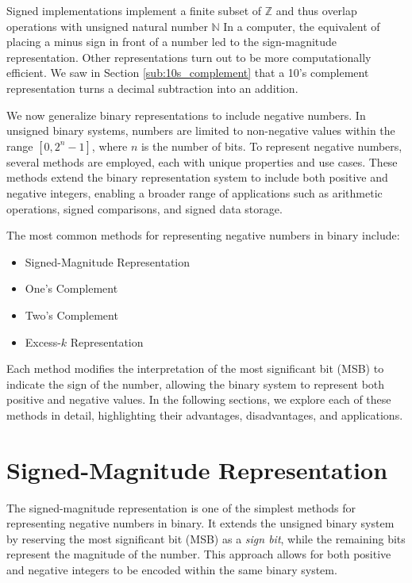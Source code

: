 Signed implementations implement a finite subset of $\mathbb{Z}$ and thus overlap operations with unsigned natural number $\mathbb{N}$ In a computer, the equivalent of placing a minus sign in front of a number led to the sign-magnitude representation. Other representations turn out to be more computationally efficient.  We saw in Section \ref{sub:10s_complement} that a 10's complement representation turns a decimal subtraction into an addition. 

We now generalize binary representations to include negative numbers. In unsigned binary systems, numbers are limited to non-negative values within the range \( [0, 2^n - 1] \), where \( n \) is the number of bits. To represent negative numbers, several methods are employed, each with unique properties and use cases. These methods extend the binary representation system to include both positive and negative integers, enabling a broader range of applications such as arithmetic operations, signed comparisons, and signed data storage.

The most common methods for representing negative numbers in binary include:
\begin{itemize}
    \item Signed-Magnitude Representation
    \item One's Complement
    \item Two's Complement
    \item Excess-\( k \) Representation
\end{itemize}

Each method modifies the interpretation of the most significant bit (MSB) to indicate the sign of the number, allowing the binary system to represent both positive and negative values. In the following sections, we explore each of these methods in detail, highlighting their advantages, disadvantages, and applications.

\section{Signed-Magnitude Representation}
The signed-magnitude representation is one of the simplest methods for representing negative numbers in binary. It extends the unsigned binary system by reserving the most significant bit (MSB) as a \textit{sign bit}, while the remaining bits represent the magnitude of the number. This approach allows for both positive and negative integers to be encoded within the same binary system.

